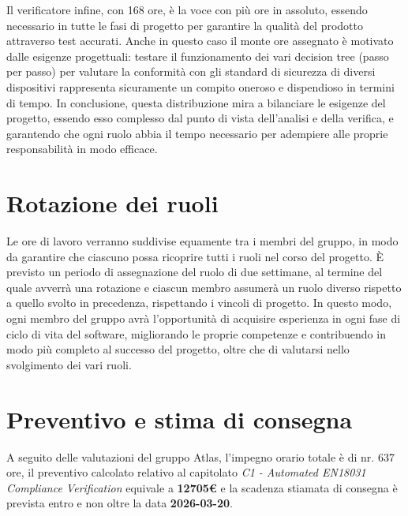 \documentclass[a4paper,12pt]{article}
\begin{document}
{{        Il verificatore infine, con 168 ore, è la voce con più ore in assoluto, essendo necessario in tutte le fasi di progetto per garantire la qualità del prodotto attraverso test accurati. Anche in questo caso il monte ore assegnato è motivato dalle esigenze progettuali: testare il funzionamento dei vari decision tree (passo per passo) per valutare la conformità con gli standard di sicurezza di diversi dispositivi rappresenta sicuramente un compito oneroso e dispendioso in termini di tempo.
        \vspace{0.3cm}
        \newline
        In conclusione, questa distribuzione mira a bilanciare le esigenze del progetto, essendo esso complesso dal punto di vista dell'analisi e della verifica, e garantendo che ogni ruolo abbia il tempo necessario per adempiere alle proprie responsabilità in modo efficace.
    }
}

\section{Rotazione dei ruoli}{
    Le ore di lavoro verranno suddivise equamente tra i membri del gruppo, in modo da garantire che ciascuno possa ricoprire tutti i ruoli nel corso del progetto. È previsto un periodo di assegnazione del ruolo di due settimane, al termine del quale avverrà una rotazione e ciascun membro assumerà un ruolo diverso rispetto a quello svolto in precedenza, rispettando i vincoli di progetto. In questo modo, ogni membro del gruppo avrà l'opportunità di acquisire esperienza in ogni fase di ciclo di vita del software, migliorando le proprie competenze e contribuendo in modo più completo al successo del progetto, oltre che di valutarsi nello svolgimento dei vari ruoli.
}

\section{Preventivo e stima di consegna}{
    A seguito delle valutazioni del gruppo Atlas, l'impegno orario totale è di nr. 637 ore, il preventivo calcolato relativo al capitolato \textit{C1 - Automated EN18031 Compliance Verification} equivale a \textbf{12705€} e la scadenza stiamata di consegna è prevista entro e non oltre la data \textbf{2026-03-20}.
}
\end{document}
